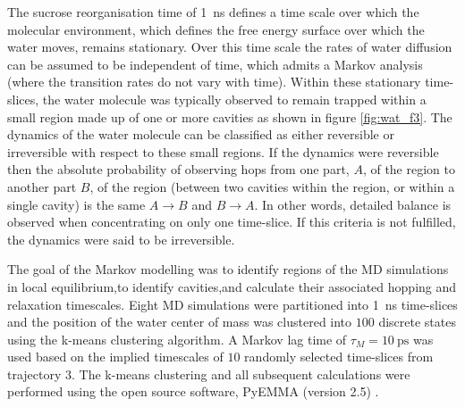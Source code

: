 The sucrose reorganisation time of \SI{1}{\nano\second} defines a time scale over which the molecular environment, which defines the free energy surface over which the water moves, remains stationary.  Over this time scale the rates of water diffusion can be assumed to be independent of time, which admits a Markov analysis (where the transition rates do not vary with time).  Within these stationary time-slices, the water molecule was typically observed to remain trapped within a small region made up of one or more cavities as shown in figure \ref{fig:wat_f3}.  The dynamics of the water molecule can be classified as either reversible or irreversible with respect to these small regions.  If the dynamics were reversible then the absolute probability of observing hops from one part, $A$, of the region to another part $B$, of the region (between two cavities within the region, or within a single cavity) is the same $A\rightarrow B$ and $B\rightarrow A$. In other words, detailed balance is observed when concentrating on only one time-slice.  If this criteria is not fulfilled, the dynamics were said to be irreversible. 

The goal of the Markov modelling was to identify regions of the MD simulations in local equilibrium,to identify cavities,and calculate their associated hopping and relaxation timescales. Eight MD simulations were partitioned into \SI{1}{\nano\second} time-slices and the position of the water center of mass was clustered into $100$ discrete states using the k-means \cite{lloydLeastSquaresQuantization1982} clustering algorithm. A Markov lag time of $\tau_{M} = \SI{10}{\pico\second}$ was used based on the implied timescales of $10$ randomly selected time-slices from trajectory \num{3}.  The k-means clustering and all subsequent calculations were performed using the open source software, PyEMMA (version 2.5) \cite{schererPyEMMASoftwarePackage2015a}. 

